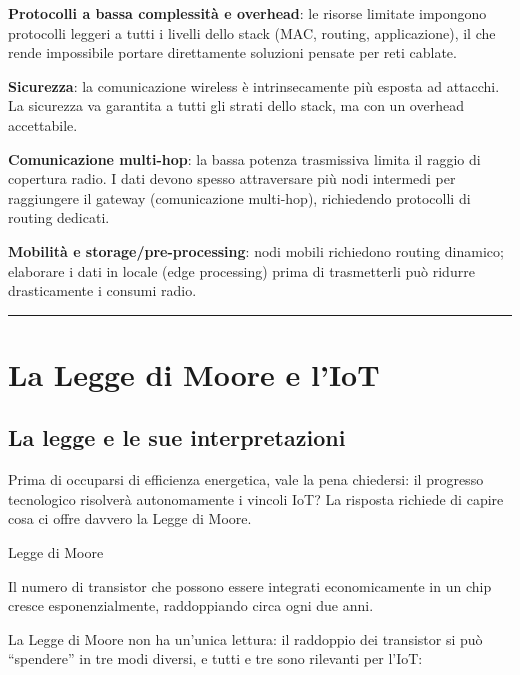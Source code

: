 \documentclass[
  italian,
  openany]{book}
\begin{document}
\textbf{Protocolli a bassa complessità e overhead}: le risorse limitate
impongono protocolli leggeri a tutti i livelli dello stack (MAC,
routing, applicazione), il che rende impossibile portare direttamente
soluzioni pensate per reti cablate.

\textbf{Sicurezza}: la comunicazione wireless è intrinsecamente più
esposta ad attacchi. La sicurezza va garantita a tutti gli strati dello
stack, ma con un overhead accettabile.

\textbf{Comunicazione multi-hop}: la bassa potenza trasmissiva limita il
raggio di copertura radio. I dati devono spesso attraversare più nodi
intermedi per raggiungere il gateway (comunicazione multi-hop),
richiedendo protocolli di routing dedicati.

\textbf{Mobilità e storage/pre-processing}: nodi mobili richiedono
routing dinamico; elaborare i dati in locale (edge processing) prima di
trasmetterli può ridurre drasticamente i consumi radio.

\begin{center}\rule{0.5\linewidth}{0.5pt}\end{center}

\section{La Legge di Moore e l'IoT}\label{la-legge-di-moore-e-liot}

\subsection{La legge e le sue
interpretazioni}\label{la-legge-e-le-sue-interpretazioni}

Prima di occuparsi di efficienza energetica, vale la pena chiedersi: il
progresso tecnologico risolverà autonomamente i vincoli IoT? La risposta
richiede di capire cosa ci offre davvero la Legge di Moore.

\begin{calloutdefinition}{Legge di Moore}

Il numero di transistor che possono essere integrati economicamente in
un chip cresce esponenzialmente, raddoppiando circa ogni due anni.

\end{calloutdefinition}

La Legge di Moore non ha un'unica lettura: il raddoppio dei transistor
si può ``spendere'' in tre modi diversi, e tutti e tre sono rilevanti
per l'IoT:
\end{document}
